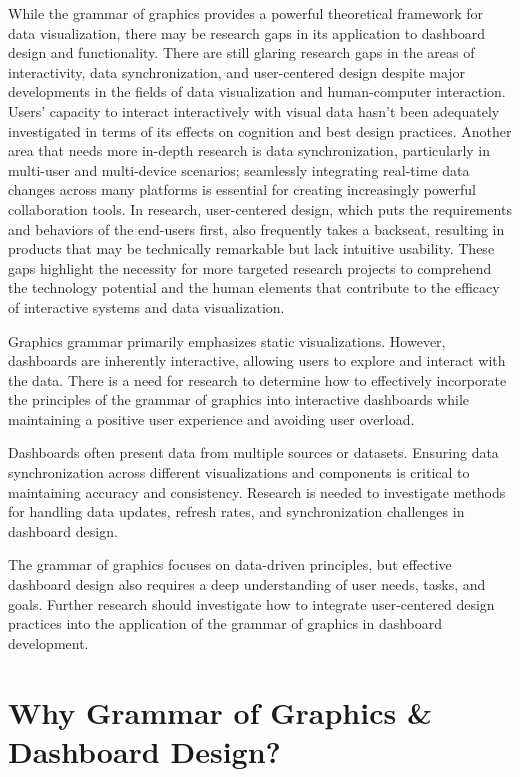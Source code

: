 \documentclass[print]{nuthesis}
\begin{document}
While the grammar of graphics provides a powerful theoretical framework for data visualization, there may be research gaps in its application to dashboard design and functionality.
There are still glaring research gaps in the areas of interactivity, data synchronization, and user-centered design despite major developments in the fields of data visualization and human-computer interaction.
Users' capacity to interact interactively with visual data hasn't been adequately investigated in terms of its effects on cognition and best design practices.
Another area that needs more in-depth research is data synchronization, particularly in multi-user and multi-device scenarios; seamlessly integrating real-time data changes across many platforms is essential for creating increasingly powerful collaboration tools.
In research, user-centered design, which puts the requirements and behaviors of the end-users first, also frequently takes a backseat, resulting in products that may be technically remarkable but lack intuitive usability.
These gaps highlight the necessity for more targeted research projects to comprehend the technology potential and the human elements that contribute to the efficacy of interactive systems and data visualization.

Graphics grammar primarily emphasizes static visualizations.
However, dashboards are inherently interactive, allowing users to explore and interact with the data.
There is a need for research to determine how to effectively incorporate the principles of the grammar of graphics into interactive dashboards while maintaining a positive user experience and avoiding user overload.

Dashboards often present data from multiple sources or datasets.
Ensuring data synchronization across different visualizations and components is critical to maintaining accuracy and consistency.
Research is needed to investigate methods for handling data updates, refresh rates, and synchronization challenges in dashboard design.

The grammar of graphics focuses on data-driven principles, but effective dashboard design also requires a deep understanding of user needs, tasks, and goals.
Further research should investigate how to integrate user-centered design practices into the application of the grammar of graphics in dashboard development.

\hypertarget{why-grammar-of-graphics-dashboard-design}{%
\section{Why Grammar of Graphics \& Dashboard Design?}\label{why-grammar-of-graphics-dashboard-design}}
\end{document}

